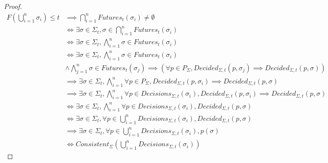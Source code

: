 \documentclass{article}
\theoremstyle{definition}
\begin{document}
\begin{proof}
\begin{align}
F(\bigcup_{i=1}^n \sigma_i) \leq t &\implies \bigcap_{i=1}^n Futures_t(\sigma_i) \neq \emptyset \\
&\iff \exists \sigma \in \Sigma_t, \sigma \in \bigcap_{i = 1}^n Futures_t(\sigma_i) \\
&\iff \exists \sigma \in \Sigma_t, \bigwedge_{i = 1}^n \sigma \in Futures_t(\sigma_i) \\
&\iff \exists \sigma \in \Sigma_t, \bigwedge_{i = 1}^n \sigma \in Futures_t(\sigma_i)  \\
&\land \bigwedge_{j = 1}^n \sigma \in Futures_t(\sigma_j) \implies (\forall p \in P_\Sigma, Decided_{\Sigma, t}(p,\sigma_j) \implies Decided_{\Sigma, t}(p, \sigma)) \\
&\implies \exists \sigma \in \Sigma_t,\bigwedge_{i = 1}^n \forall p \in P_\Sigma, Decided_{\Sigma, t}(p,\sigma_i) \implies Decided_{\Sigma, t}(p, \sigma) \\
&\implies \exists \sigma \in \Sigma_t,\bigwedge_{i = 1}^n \forall p \in Decisions_{\Sigma,t}(\sigma_i), Decided_{\Sigma, t}(p,\sigma_i) \implies Decided_{\Sigma, t}(p, \sigma)\\
&\iff \exists \sigma \in \Sigma_t, \bigwedge_{i = 1}^n \forall p \in Decisions_{\Sigma,t}(\sigma_i), Decided_{\Sigma, t}(p, \sigma)\\
&\iff \exists \sigma \in \Sigma_t, \forall p \in \bigcup_{i=1}^n Decisions_{\Sigma,t}(\sigma_i), Decided_{\Sigma, t}(p, \sigma)\\
&\implies \exists \sigma \in \Sigma_t, \forall p \in \bigcup_{i=1}^n Decisions_{\Sigma,t}(\sigma_i), p(\sigma)\\
&\iff Consistent_\Sigma(\bigcup_{i=1}^n Decisions_{\Sigma,t}(\sigma_i))
\end{align}
\end{proof}


\iffalse
\begin{proof}
Let %
$ \sigma=\bigcup_{i=1}^n \sigma_i \in \bigcap_{i=1}^n Futures_t(\sigma_i)$. For any $i$, for any $p \in Decisions_{\Sigma,t}(\sigma_i)$, we have that $Decided_{\Sigma, t}(p,\sigma)$ from lemma \ref{lem:forw_safe}.
 We have that $Decisions_{\Sigma,t}(\sigma_1,\sigma_2,\dots,\sigma_n)\subseteq Decisions_{\Sigma,t}(\sigma)$.
Hence $\mathcal{E}(\sigma)$ is a set of consensus values that satisfies all properties $p \in Decisions_{\Sigma,t}(\sigma_1,\sigma_2,\dots,\sigma_n)$. Therefore $\exists c \in \mathcal{C}, \forall p \in Decisions_{\Sigma,t}(\sigma_1,\sigma_2,\dots,\sigma_n)~ p(c)$.
\end{proof}
\fi
\end{document}
